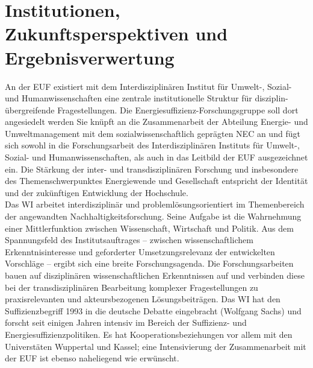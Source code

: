 \documentclass[a4paper,11pt,twoside]{scrartcl}
\begin{document}
\section{Institutionen, Zukunftsperspektiven und Ergebnisverwertung}
An der EUF existiert mit dem Interdisziplinären Institut für Umwelt-, Sozial- und Humanwissenschaften eine zentrale institutionelle Struktur für disziplin-übergreifende Fragestellungen. Die Energiesuffizienz-Forschungsgruppe soll dort angesiedelt werden Sie knüpft an die Zusammenarbeit der Abteilung Energie- und Umweltmanagement mit dem sozialwissenschaftlich geprägten NEC an und fügt sich sowohl in die Forschungsarbeit des Interdisziplinären Instituts für Umwelt-, Sozial- und Humanwissenschaften, als auch in das Leitbild der EUF ausgezeichnet ein. Die Stärkung der inter- und transdisziplinären Forschung und insbesondere des Themenschwerpunktes Energiewende und Gesellschaft entspricht der Identität und der zukünftigen Entwicklung der Hochschule.\\
Das WI arbeitet interdisziplinär und problemlösungsorientiert im Themenbereich der angewandten Nachhaltigkeitsforschung. Seine Aufgabe ist die Wahrnehmung einer Mittlerfunktion zwischen Wissenschaft, Wirtschaft und Politik. Aus dem Spannungsfeld des Institutsauftrages – zwischen wissenschaftlichem Erkenntnisinteresse und geforderter Umsetzungsrelevanz der entwickelten Vorschläge – ergibt sich eine breite Forschungsagenda. Die Forschungsarbeiten bauen auf disziplinären wissenschaftlichen Erkenntnissen auf und verbinden diese bei der transdisziplinären Bearbeitung komplexer Fragestellungen zu praxisrelevanten und akteursbezogenen Lösungsbeiträgen. Das WI hat den Suffizienzbegriff 1993 in die deutsche Debatte eingebracht (Wolfgang Sachs) und forscht seit einigen Jahren intensiv im Bereich der Suffizienz- und Energiesuffizienzpolitiken. Es hat Kooperationsbeziehungen vor allem mit den Universtäten Wuppertal und Kassel; eine Intensivierung der Zusammenarbeit mit der EUF ist ebenso naheliegend wie erwünscht.\\
\end{document}
